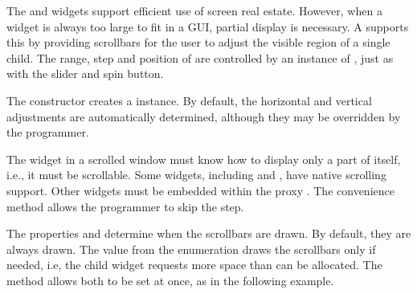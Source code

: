 The  and  widgets support
efficient use of screen real estate. However, when a widget is always
too large to fit in a GUI, partial display is necessary. A
 supports this by providing scrollbars for
the user to adjust the visible region of a single child. The range, step
and position of  are controlled by an instance of
, just as with the slider and spin button.

The constructor  creates a
 instance. By default, the horizontal and
vertical adjustments are automatically determined, although they may
be overridden by the programmer.

The widget in a scrolled window must know how to display only a part
of itself, i.e., it must be scrollable. Some widgets, including
 and , have native scrolling
support. Other widgets must be embedded within the proxy
. The  convenience method
 allows the programmer to
skip the  step.

The properties  and 
determine when the scrollbars are drawn. By default, they are always
drawn. The  value from the 
enumeration draws the scrollbars only if needed, i.e, the
child widget requests more space than can be allocated. The
 method allows both to be set at
once, as in the following example.

